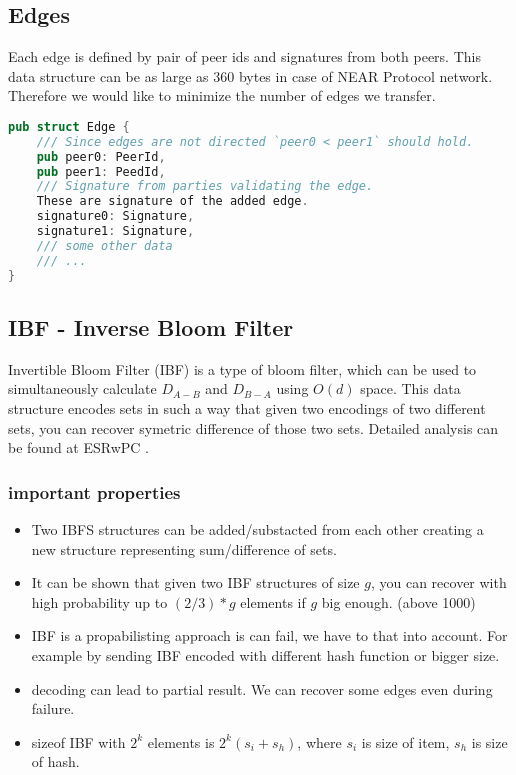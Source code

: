\documentclass[11pt]{article}
\begin{document}
\subsection{Edges}
Each edge is defined by pair of peer ids and signatures from both peers.
This data structure can be as large as 360 bytes in case of NEAR Protocol network.
Therefore we would like to minimize the number of edges we transfer.
\begin{lstlisting}[language=Rust]
pub struct Edge {
    /// Since edges are not directed `peer0 < peer1` should hold.
    pub peer0: PeerId,
    pub peer1: PeedId,
    /// Signature from parties validating the edge.
    These are signature of the added edge.
    signature0: Signature,
    signature1: Signature,
    /// some other data
    /// ...
}
\end{lstlisting}

\subsection{IBF - Inverse Bloom Filter}
Invertible Bloom Filter (IBF) is a type of bloom filter, which can be used to simultaneously calculate  $D_{A-B}$ and $D_{B-A}$ using $O(d)$ space.
This data structure encodes sets in such a way that given two encodings  of two different sets, you can recover symetric difference of those two sets.
Detailed analysis can be found at ESRwPC \cite{esrwpc}.
\subsubsection{important properties}
\begin{itemize}
\item Two IBFS structures can be added/substacted from each other creating a new structure representing sum/difference of sets.
\item It can be shown that given two IBF structures of size $g$, you can recover with high probability up to $(2/3)*g$ elements if $g$ big enough. (above 1000)  \cite{esrwpc}
\item IBF is a propabilisting approach is can fail, we have to that into account. For example by sending IBF encoded with different hash function or bigger size.
\item decoding can lead to partial result. We can recover some edges even during failure.
\item sizeof IBF with $2^k$ elements is $2^k(s_i + s_h)$, where $s_i$ is size of item, $s_h$ is size of hash.
\end{itemize}
\end{document}
